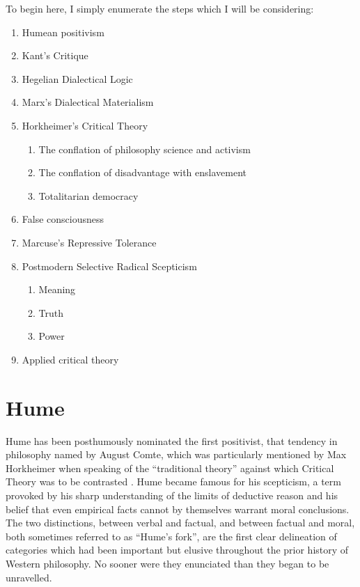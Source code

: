 \documentclass[10pt,titlepage]{book}
\begin{document}
To begin here, I simply enumerate the steps which I will be considering:

\begin{enumerate}
\item Humean positivism
\item Kant's Critique
\item Hegelian Dialectical Logic
\item Marx's Dialectical Materialism
\item Horkheimer's Critical Theory
  \begin{enumerate}
  \item The conflation of philosophy science and activism
  \item The conflation of disadvantage with enslavement
  \item Totalitarian democracy
  \end{enumerate}
  \item False consciousness
\item Marcuse's Repressive Tolerance
\item Postmodern Selective Radical Scepticism
  \begin{enumerate}
  \item Meaning
  \item Truth
  \item Power
    \end{enumerate}
\item Applied critical theory
\end{enumerate}


\section{Hume}

Hume has been posthumously nominated the first positivist, that tendency in philosophy named by August Comte, which was particularly mentioned by Max Horkheimer when speaking of the ``traditional theory'' against which Critical Theory was to be contrasted \cite{horkheimer-trad}.
Hume became famous for his scepticism, a term provoked by his sharp understanding of the limits of deductive reason and his belief that even empirical facts cannot by themselves warrant moral conclusions.
The two distinctions, between verbal and factual, and between factual and moral, both sometimes referred to as ``Hume's fork'', are the first clear delineation of categories which had been important but elusive throughout the prior history of Western philosophy.
No sooner were they enunciated than they began to be unravelled.
\end{document}
